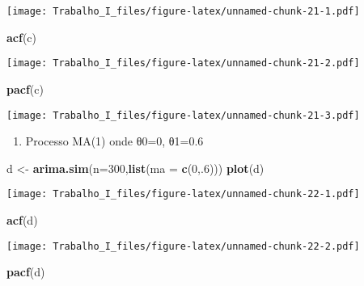 \documentclass[]{article}
\newenvironment{Shaded}{\begin{snugshade}}{\end{snugshade}}
\newcommand{\KeywordTok}[1]{\textcolor[rgb]{0.13,0.29,0.53}{\textbf{#1}}}
\newcommand{\DataTypeTok}[1]{\textcolor[rgb]{0.13,0.29,0.53}{#1}}
\newcommand{\DecValTok}[1]{\textcolor[rgb]{0.00,0.00,0.81}{#1}}
\newcommand{\StringTok}[1]{\textcolor[rgb]{0.31,0.60,0.02}{#1}}
\newcommand{\NormalTok}[1]{#1}
\providecommand{\tightlist}{%
  \setlength{\itemsep}{0pt}\setlength{\parskip}{0pt}}
\begin{document}
\texttt{[image: Trabalho\_I\_files/figure-latex/unnamed-chunk-21-1.pdf]}

\begin{Shaded}
\begin{Highlighting}[]
\KeywordTok{acf}\NormalTok{(c)}
\end{Highlighting}
\end{Shaded}

\texttt{[image: Trabalho\_I\_files/figure-latex/unnamed-chunk-21-2.pdf]}

\begin{Shaded}
\begin{Highlighting}[]
\KeywordTok{pacf}\NormalTok{(c)}
\end{Highlighting}
\end{Shaded}

\texttt{[image: Trabalho\_I\_files/figure-latex/unnamed-chunk-21-3.pdf]}

\begin{enumerate}
\def\labelenumi{\alph{enumi})}
\setcounter{enumi}{3}
\tightlist
\item
  Processo MA(1) onde θ0=0, θ1=0.6
\end{enumerate}

\begin{Shaded}
\begin{Highlighting}[]
\NormalTok{d <-}\StringTok{ }\KeywordTok{arima.sim}\NormalTok{(}\DataTypeTok{n=}\DecValTok{300}\NormalTok{,}\KeywordTok{list}\NormalTok{(}\DataTypeTok{ma =} \KeywordTok{c}\NormalTok{(}\DecValTok{0}\NormalTok{,.}\DecValTok{6}\NormalTok{)))}
\KeywordTok{plot}\NormalTok{(d)}
\end{Highlighting}
\end{Shaded}

\texttt{[image: Trabalho\_I\_files/figure-latex/unnamed-chunk-22-1.pdf]}

\begin{Shaded}
\begin{Highlighting}[]
\KeywordTok{acf}\NormalTok{(d)}
\end{Highlighting}
\end{Shaded}

\texttt{[image: Trabalho\_I\_files/figure-latex/unnamed-chunk-22-2.pdf]}

\begin{Shaded}
\begin{Highlighting}[]
\KeywordTok{pacf}\NormalTok{(d)}
\end{Highlighting}
\end{Shaded}
\end{document}

